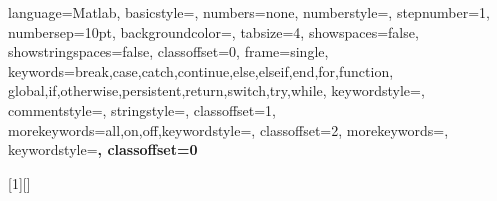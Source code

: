 %
%
%

{
   language=Matlab,
   basicstyle=\ttfamily,
   numbers=none, %
   numberstyle=\tiny\color{black},
   stepnumber=1,
   numbersep=10pt,
   backgroundcolor=\color{white},
   tabsize=4,
   showspaces=false,
   showstringspaces=false,
   classoffset=0, %
   frame=single,  %
   keywords={break,case,catch,continue,else,elseif,end,for,function,
             global,if,otherwise,persistent,return,switch,try,while},
   keywordstyle=\color{blue},
   commentstyle=\color{dkgreen},
   stringstyle=\color{purple},
   classoffset=1, %
   morekeywords={all,on,off},keywordstyle=\color{purple},
   classoffset=2, %
   morekeywords={},
   keywordstyle=\color{black}\bfseries,
   classoffset=0  %
}

[1][]{\lstset{style=Matlab,#1}}{}
\newcommand{\inputMatlabCode}[2][]
           {}